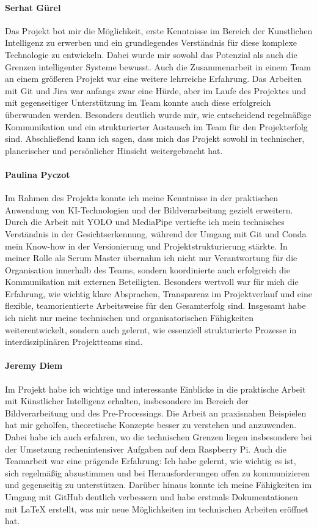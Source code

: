\paragraph{Serhat Gürel}
Das Projekt bot mir die Möglichkeit, erste Kenntnisse im Bereich der Kunstlichen Intelligenz zu erwerben und ein grundlegendes Verständnis für diese komplexe Technologie zu entwickeln. Dabei wurde mir sowohl das Potenzial als auch die Grenzen intelligenter Systeme bewusst. Auch die Zusammenarbeit in einem Team an einem größeren Projekt war eine weitere lehrreiche Erfahrung. Das Arbeiten mit Git und Jira war anfangs zwar eine Hürde, aber im Laufe des Projektes und mit gegenseitiger Unterstützung im Team konnte auch diese erfolgreich überwunden werden. Besonders deutlich wurde mir, wie entscheidend regelmäßige Kommunikation und ein strukturierter Austausch im Team für den Projekterfolg sind. Abschließend kann ich sagen, dass mich das Projekt sowohl in technischer, planerischer und persönlicher Hinsicht weitergebracht hat.

\paragraph{Paulina Pyczot}
Im Rahmen des Projekts konnte ich meine Kenntnisse in der praktischen Anwendung von KI-Technologien und der Bildverarbeitung gezielt erweitern. Durch die Arbeit mit YOLO und MediaPipe vertiefte ich mein technisches Verständnis in der Gesichtserkennung, während der Umgang mit Git und Conda mein Know-how in der Versionierung und Projektstrukturierung stärkte. In meiner Rolle als Scrum Master übernahm ich nicht nur Verantwortung für die Organisation innerhalb des Teams, sondern koordinierte auch erfolgreich die Kommunikation mit externen Beteiligten. Besonders wertvoll war für mich die Erfahrung, wie wichtig klare Absprachen, Transparenz im Projektverlauf und eine flexible, teamorientierte Arbeitsweise für den Gesamterfolg sind. Insgesamt habe ich nicht nur meine technischen und organisatorischen Fähigkeiten weiterentwickelt, sondern auch gelernt, wie essenziell strukturierte Prozesse in interdisziplinären Projektteams sind.

\paragraph{Jeremy Diem}
Im Projekt habe ich wichtige und interessante Einblicke in die praktische Arbeit mit Künstlicher Intelligenz erhalten, insbesondere im Bereich der Bildverarbeitung und des Pre-Processings. Die Arbeit an praxisnahen Beispielen hat mir geholfen, theoretische Konzepte besser zu verstehen und anzuwenden. Dabei habe ich auch erfahren, wo die technischen Grenzen liegen insbesondere bei der Umsetzung rechenintensiver Aufgaben auf dem Raspberry Pi. Auch die Teamarbeit war eine prägende Erfahrung: Ich habe gelernt, wie wichtig es ist, sich regelmäßig abzustimmen und bei Herausforderungen offen zu kommunizieren und gegenseitig zu unterstützen. Darüber hinaus konnte ich meine Fähigkeiten im Umgang mit GitHub deutlich verbessern und habe erstmals Dokumentationen mit LaTeX erstellt, was mir neue Möglichkeiten im technischen Arbeiten eröffnet hat. 